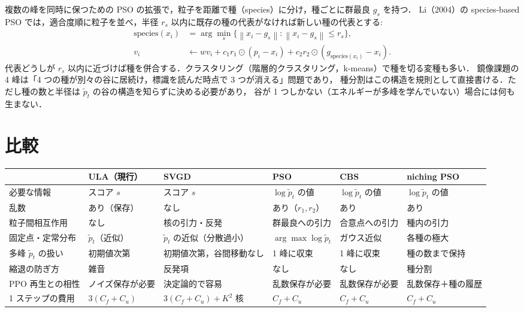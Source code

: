 \documentclass[a4paper,11pt]{article}
\newcommand{\ptil}{\tilde p_t}
\newcommand{\nrm}[1]{\left\lVert #1 \right\rVert}
\begin{document}
複数の峰を同時に保つための PSO の拡張で，粒子を距離で種（species）に分け，種ごとに群最良 $g_s$ を持つ．
Li（2004）の species-based PSO では，適合度順に粒子を並べ，半径 $r_s$ 以内に既存の種の代表がなければ新しい種の代表とする:
\begin{align}
  \text{species}(x_i) &= \arg\min_{s} \big\{ \nrm{x_i - g_s} : \nrm{x_i - g_s} \le r_s \big\}, \\
  v_i &\leftarrow w v_i + c_1 r_1 \odot (p_i - x_i) + c_2 r_2 \odot (g_{\text{species}(x_i)} - x_i).
\end{align}
代表どうしが $r_s$ 以内に近づけば種を併合する．クラスタリング（階層的クラスタリング，k-means）で種を切る変種も多い．
鏡像課題の 4 峰は「4 つの種が別々の谷に居続け，標識を読んだ時点で 3 つが消える」問題であり，
種分割はこの構造を規則として直接書ける．ただし種の数と半径は $\ptil$ の谷の構造を知らずに決める必要があり，
谷が 1 つしかない（エネルギーが多峰を学んでいない）場合には何も生まない．

\section{比較}

\begin{center}
\footnotesize
\begin{tabular}{p{28mm}p{21mm}p{23mm}p{21mm}p{21mm}p{22mm}}
\toprule
 & ULA（現行） & SVGD & PSO & CBS & niching PSO \\
\midrule
必要な情報 & スコア $s$ & スコア $s$ & $\log\ptil$ の値 & $\log\ptil$ の値 & $\log\ptil$ の値 \\
乱数 & あり（保存） & なし & あり（$r_1, r_2$） & あり & あり \\
粒子間相互作用 & なし & 核の引力・反発 & 群最良への引力 & 合意点への引力 & 種内の引力 \\
固定点・定常分布 & $\ptil$（近似） & $\ptil$ の近似（分散過小） & $\arg\max \log\ptil$ & ガウス近似 & 各種の極大 \\
多峰 $\ptil$ の扱い & 初期値次第 & 初期値次第，谷間移動なし & 1 峰に収束 & 1 峰に収束 & 種の数まで保持 \\
縮退の防ぎ方 & 雑音 & 反発項 & なし & なし & 種分割 \\
PPO 再生との相性 & ノイズ保存が必要 & 決定論的で容易 & 乱数保存が必要 & 乱数保存が必要 & 乱数保存＋種の履歴 \\
1 ステップの費用 & $3(C_f + C_u)$ & $3(C_f+C_u) + K^2$ 核 & $C_f + C_u$ & $C_f + C_u$ & $C_f + C_u$ \\
\bottomrule
\end{tabular}
\end{center}
\end{document}
